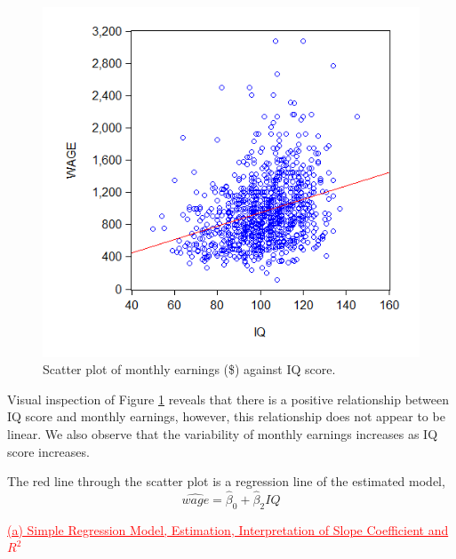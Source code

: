 \documentclass[12pt]{report}
\begin{document}
\vspace{-\baselineskip}
\begin{figure}[H]
	\centerline{\includegraphics{q3_10}}
	\caption{Scatter plot of monthly earnings (\$) against IQ score.}
	\label{fig:scat1}
\end{figure}
\vspace{-\baselineskip}
\noindent Visual inspection of Figure \ref{fig:scat1} reveals that there is a positive relationship between IQ score and monthly earnings, however, this relationship does not appear to be linear. We also observe that the variability of monthly earnings increases as IQ score increases. \par
\noindent The red line through the scatter plot is a regression line of the estimated model,
$$\widehat{wage} = \hat{\beta}_0 + \hat{\beta}_2IQ$$

\noindent \textcolor{red}{\underline{(a) Simple Regression Model, Estimation, Interpretation of Slope Coefficient and $R^2$}}
\end{document}
